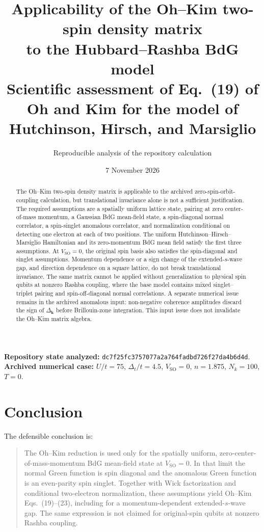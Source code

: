 \documentclass[11pt]{article}
\title{\textbf{Applicability of the Oh--Kim two-spin density matrix\\to the Hubbard--Rashba BdG model}\\[0.5em]
\large Scientific assessment of Eq.~(19) of Oh and Kim for the model of Hutchinson, Hirsch, and Marsiglio}
\author{Reproducible analysis of the repository calculation}
\date{7 November 2026}
\newcommand{\SO}{\mathrm{SO}}
\begin{document}
\maketitle

\begin{abstract}
\noindent
The Oh--Kim two-spin density matrix is applicable to the archived zero-spin-orbit-coupling calculation, but translational invariance alone is not a sufficient justification. The required assumptions are a spatially uniform lattice state, pairing at zero center-of-mass momentum, a Gaussian BdG mean-field state, a spin-diagonal normal correlator, a spin-singlet anomalous correlator, and normalization conditional on detecting one electron at each of two positions. The uniform Hutchinson--Hirsch--Marsiglio Hamiltonian and its zero-momentum BdG mean field satisfy the first three assumptions. At $V_{\SO}=0$, the original spin basis also satisfies the spin-diagonal and singlet assumptions. Momentum dependence or a sign change of the extended-$s$-wave gap, and direction dependence on a square lattice, do not break translational invariance. The same matrix cannot be applied without generalization to physical spin qubits at nonzero Rashba coupling, where the base model contains mixed singlet--triplet pairing and spin-off-diagonal normal correlations. A separate numerical issue remains in the archived anomalous input: non-negative coherence amplitudes discard the sign of $\Delta_{\mathbf k}$ before Brillouin-zone integration. This input issue does not invalidate the Oh--Kim matrix algebra.
\end{abstract}

\textbf{Repository state analyzed:} \texttt{dc7f25fc3757077a2a764fadbd726f27da4b6d4d}.\\
\textbf{Archived numerical case:} $U/t=75$, $\Delta_t/t=4.5$, $V_{\SO}=0$, $n=1.875$, $N_k=100$, $T=0$.

\section{Conclusion}

The defensible conclusion is:
\begin{quote}
The Oh--Kim reduction is used only for the spatially uniform, zero-center-of-mass-momentum BdG mean-field state at $V_{\SO}=0$. In that limit the normal Green function is spin diagonal and the anomalous Green function is an even-parity spin singlet. Together with Wick factorization and conditional two-electron normalization, these assumptions yield Oh--Kim Eqs.~(19)--(23), including for a momentum-dependent extended-$s$-wave gap. The same expression is not claimed for original-spin qubits at nonzero Rashba coupling.
\end{quote}
\end{document}
